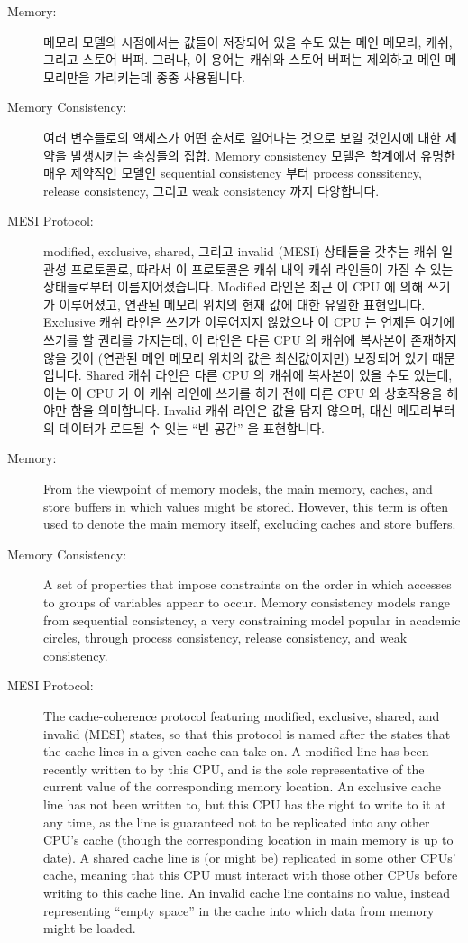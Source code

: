 \begin{description}
\item[Memory:]
	메모리 모델의 시점에서는 값들이 저장되어 있을 수도 있는 메인 메모리,
	캐쉬, 그리고 스토어 버퍼.
	그러나, 이 용어는 캐쉬와 스토어 버퍼는 제외하고 메인 메모리만을
	가리키는데 종종 사용됩니다.
\item[Memory Consistency:]
	여러 변수들로의 액세스가 어떤 순서로 일어나는 것으로 보일 것인지에 대한
	제약을 발생시키는 속성들의 집합.
	Memory consistency 모델은 학계에서 유명한 매우 제약적인 모델인
	sequential consistency 부터 process conssitency, release consistency,
	그리고 weak consistency 까지 다양합니다.
\item[MESI Protocol:]
	modified, exclusive, shared, 그리고 invalid (MESI) 상태들을 갖추는 캐쉬
	일관성 프로토콜로, 따라서 이 프로토콜은 캐쉬 내의 캐쉬 라인들이 가질 수
	있는 상태들로부터 이름지어졌습니다.
	Modified 라인은 최근 이 CPU 에 의해 쓰기가 이루어졌고, 연관된 메모리
	위치의 현재 값에 대한 유일한 표현입니다.
	Exclusive 캐쉬 라인은 쓰기가 이루어지지 않았으나 이 CPU 는 언제든
	여기에 쓰기를 할 권리를 가지는데, 이 라인은 다른 CPU 의 캐쉬에 복사본이
	존재하지 않을 것이 (연관된 메인 메모리 위치의 값은 최신값이지만)
	보장되어 있기 때문입니다.
	Shared 캐쉬 라인은 다른 CPU 의 캐쉬에 복사본이 있을 수도 있는데, 이는
	이 CPU 가 이 캐쉬 라인에 쓰기를 하기 전에 다른 CPU 와 상호작용을 해야만
	함을 의미합니다.
	Invalid 캐쉬 라인은 값을 담지 않으며, 대신 메모리부터의 데이터가 로드될
	수 잇는 ``빈 공간'' 을 표현합니다.

\iffalse

\item[Memory:]
	From the viewpoint of memory models, the main memory,
	caches, and store buffers in which values might be stored.
	However, this term is often used to denote the main memory
	itself, excluding caches and store buffers.
\item[Memory Consistency:]
	A set of properties that impose constraints on the order in
	which accesses to groups of variables appear to occur.
	Memory consistency models range from sequential consistency,
	a very constraining model popular in academic circles, through
	process consistency, release consistency, and weak consistency.
\item[MESI Protocol:]
	The
	cache-coherence protocol featuring
	modified, exclusive, shared, and invalid (MESI) states,
	so that this protocol is named after the states that the
	cache lines in a given cache can take on.
	A modified line has been recently written to by this CPU,
	and is the sole representative of the current value of
	the corresponding memory location.
	An exclusive cache line has not been written to, but this
	CPU has the right to write to it at any time, as the line
	is guaranteed not to be replicated into any other CPU's cache
	(though the corresponding location in main memory is up to date).
	A shared cache line is (or might be) replicated in some other
	CPUs' cache, meaning that this CPU must interact with those other
	CPUs before writing to this cache line.
	An invalid cache line contains no value, instead representing
	``empty space'' in the cache into which data from memory might
	be loaded.


\end{description}
